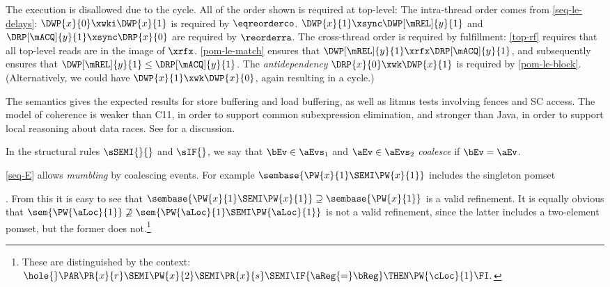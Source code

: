 The execution is disallowed due to the cycle.  All of the order shown is
required at top-level: The intra-thread order comes from \ref{seq-le-delays}:
$\DWP{x}{0}\xwki \DWP{x}{1}$ is required by $\eqreorderco$.
$\DWP{x}{1}\xsync \DWP[\mREL]{y}{1}$ and $\DRP[\mACQ]{y}{1}\xsync \DRP{x}{0}$ are
required by $\reorderra$.  The cross-thread order is required by fulfillment:
\ref{top-rf} requires that all top-level reads are in the image of $\xrfx$.
\ref{pom-le-match} ensures that $\DWP[\mREL]{y}{1}\xrfx \DRP[\mACQ]{y}{1}$, and
 subsequently ensures that
$\DWP[\mREL]{y}{1}\le \DRP[\mACQ]{y}{1}$.  The \emph{antidependency}
$\DRP{x}{0}\xwk \DWP{x}{1}$ is required by \ref{pom-le-block}.  (Alternatively,
we could have $\DWP{x}{1}\xwk \DWP{x}{0}$, again resulting in a cycle.)

The semantics gives the expected results for store buffering and load buffering,
as well as litmus tests involving fences and SC access.  The model of
coherence is weaker than C11, in order to support common subexpression
elimination, and stronger than Java, in order to support local reasoning
about data races.  See
\cite[]{DBLP:journals/pacmpl/JagadeesanJR20} for a discussion.

In the structural rules $\sSEMI{}{}$ and $\sIF{}$, we say that
$\bEv\in\aEvs_1$ and $\aEv\in\aEvs_2$ \emph{coalesce} if $\bEv=\aEv$.

\ref{seq-E} allows \emph{mumbling} \cite{DBLP:journals/iandc/Brookes96} by
coalescing events.  For example
\begin{math}
  \sembase{\PW{x}{1} \SEMI \PW{x}{1}}
\end{math}
includes the singleton pomset
\begin{tikzinlinesmall}[node distance=.5em and 1.5em]
\end{tikzinlinesmall}.  From this it is easy to see that
\begin{math}
  \sembase{\PW{x}{1}\SEMI\PW{x}{1}}
  \supseteq
  \sembase{\PW{x}{1}}
\end{math}
is a valid refinement.  It is equally obvious that
\begin{math}
  \sem{\PW{\aLoc}{1}} 
  \not\supseteq
  \sem{\PW{\aLoc}{1} \SEMI \PW{\aLoc}{1}}
\end{math}
is not a valid refinement, since the latter includes a two-element pomset,
but the former does not.\footnote{These are distinguished by the context:
  \begin{math}
    \hole{} \PAR
    \PR{x}{r} \SEMI
    \PW{x}{2} \SEMI
    \PR{x}{s}\SEMI
    \IF{\aReg {=} \bReg} \THEN \PW{\cLoc}{1} \FI.
  \end{math}}


